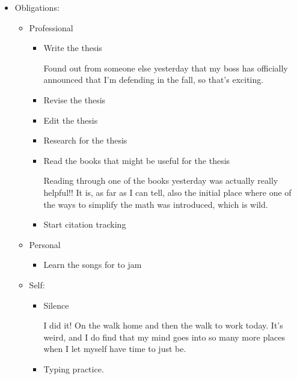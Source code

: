 \documentclass[12pt]{article}
\renewcommand{\,}{\textsuperscript{,}}
\begin{document}
\begin{itemize}

\item Obligations:

\begin{itemize}

\item Professional

\begin{itemize}

\item Write the thesis

Found out from someone else yesterday that my boss has officially announced that I'm defending in the fall, so that's exciting.

\item Revise the thesis

\item Edit the thesis

\item Research for the thesis

\item Read the books that might be useful for the thesis

Reading through one of the books yesterday was actually really helpful!!  
It is, as far as I can tell, also the initial place where one of the ways to simplify the math was introduced, which is wild.

\item Start citation tracking

\end{itemize}

\item Personal

\begin{itemize}

\item Learn the songs for to jam

\end{itemize}

\item Self:

\begin{itemize}

\item Silence

I did it! On the walk home and then the walk to work today.  
It's weird, and I do find that my mind goes into so many more places when I let myself have time to just be.

\item Typing practice.


\end{itemize}
\end{itemize}
\end{itemize}
\end{document}

